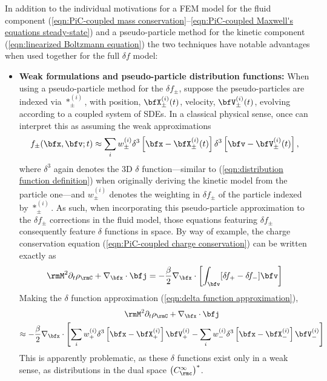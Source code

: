     In addition to the individual motivations for a FEM model for the fluid component (\ref{eqn:PiC-coupled mass conservation}--\ref{eqn:PiC-coupled Maxwell's equations steady-state}) and a pseudo-particle method for the kinetic component (\ref{eqn:linearized Boltzmann equation}) the two techniques have notable advantages when used together for the full $\delta\!f$ model:
    \begin{itemize}
        \item  {\bf Weak formulations and pseudo-particle distribution functions:} When using a pseudo-particle method for the $\delta\!f_{\pm}$, suppose the pseudo-particles are indexed via $*_{\pm}^{(i)}$, with position, $\bfX_{\pm}^{(i)}(t)$, velocity, $\bfV_{\pm}^{(i)}(t)$, evolving according to a coupled system of SDEs. In a classical physical sense, once can interpret this as assuming the weak approximations
        \begin{equation}\label{eqn:delta function approximation}
            f_{\pm}(\bfx, \bfv; t)  \approx  \sum_{i}w_{\pm}^{(i)}\delta^{3}\left[\bfx - \bfX_{\pm}^{(i)}(t)\right]\delta^{3}\left[\bfv - \bfV_{\pm}^{(i)}(t)\right],
        \end{equation}
        where $\delta^{3}$ again denotes the 3D $\delta$ function---similar to (\ref{eqn:distribution function definition}) when originally deriving the kinetic model from the particle one---and $w_{\pm}^{(i)}$ denotes the weighting in $\delta\!f_{\pm}$ of the particle indexed by $*_{\pm}^{(i)}$. As such, when incorporating this pseudo-particle approximation to the $\delta\!f_{\pm}$ corrections in the fluid model, those equations featuring $\delta\!f_{\pm}$ consequently feature $\delta$ functions in space. By way of example, the charge conservation equation (\ref{eqn:PiC-coupled charge conservation}) can be written exactly as
        \begin{equation}
            \rmM^{2}\partial_{t}\rho_{\rmC} + \nabla_{\bfx}\cdot\bfj  =  - \frac{\beta}{2}\nabla_{\bfx}\cdot\left[\int_{\bfv}[\delta\!f_{+} - \delta\!f_{-}]\bfv\right]
        \end{equation}
        Making the $\delta$ function approximation (\ref{eqn:delta function approximation}),
        \begin{multline}\label{eqn:PiC-coupled charge conservation with pseudo-particles}
            \rmM^{2}\partial_{t}\rho_{\rmC} + \nabla_{\bfx}\cdot\bfj  \\
            \approx  - \frac{\beta}{2}\nabla_{\bfx}\cdot\left[\sum_{i}w_{+}^{(i)}\delta^{3}\left[\bfx - \bfX_{+}^{(i)}\right]\bfV_{+}^{(i)} - \sum_{i}w_{-}^{(i)}\delta^{3}\left[\bfx - \bfX_{-}^{(i)}\right]\bfV_{-}^{(i)}\right]
        \end{multline}        
        This is apparently problematic, as these $\delta$ functions exist only in a weak sense, as distributions in the dual space $\left(C^{\infty}_{\rmc}\right)^{*}$.
        

\end{itemize}
